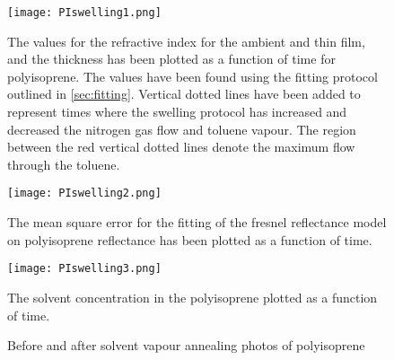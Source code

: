 \documentclass[MasterThesisMain.tex]{subfiles}
\begin{document}
\begin{figure}[H]
\centering
\texttt{[image: PIswelling1.png]}
\caption{The values for the refractive index for the ambient and thin film, and the thickness has been plotted as a function of time for polyisoprene. The values have been found using the fitting protocol outlined in \ref{sec:fitting}. Vertical dotted lines have been added to represent times where the swelling protocol has increased and decreased the nitrogen gas flow and toluene vapour. The region between the red vertical dotted lines denote the maximum flow through the toluene.}
\label{fig:PIswelling1}
\end{figure}

\begin{figure}[H]
\centering
\texttt{[image: PIswelling2.png]}
\caption{The mean square error for the fitting of the fresnel reflectance model on polyisoprene reflectance has been plotted as a function of time.}
\label{fig:PIswelling2}
\end{figure}

\begin{figure}[H]
\centering
\texttt{[image: PIswelling3.png]}
\caption{The solvent concentration in the polyisoprene plotted as a function of time.}
\label{fig:PIswelling3}
\end{figure}

\begin{figure}
\centering     
{}
\caption{Before and after solvent vapour annealing photos of polyisoprene}
\end{figure}
	
\end{document}
